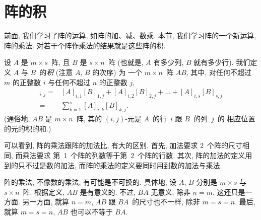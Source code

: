 \documentclass[../libro.tex]{subfiles}
\begin{document}

\section{阵的积}

前面, 我们学习了阵的运算, 如阵的加、减、数乘.
本节, 我们学习阵的一个新运算, 阵的乘法.
对若干个阵作乘法的结果就是这些阵的积.

\begin{definition}
    设 \(A\) 是 \(m \times s\)~阵,
    且 \(B\) 是 \(s \times n\)~阵
    (也就是, \(A\) 有多少列, \(B\) 就有多少行).
    我们定义 \(A\) 与 \(B\)~的\emph{积}
    (注意 \(A\), \(B\) 的次序) 为%
    一个 \(m \times n\)~阵 \(AB\),
    其中, 对任何不超过 \(m\) 的正整数 \(i\)
    与任何不超过 \(n\) 的正整数 \(j\),
    \begin{align*}
        [AB]_{i,j}
        = {} &
        [A]_{i,1} [B]_{1,j}
        + [A]_{i,2} [B]_{2,j}
        + \dots
        + [A]_{i,s} [B]_{s,j}
        \\
        = {} &
        \sum_{k = 1}^{s} {[A]_{i,k} [B]_{k,j}}.
    \end{align*}
    (通俗地, \(AB\) 是 \(m \times n\)~阵, %
    其的 \((i, j)\)-元是
    \(A\)~的行~\(i\) 跟 \(B\)~的列~\(j\)~的%
    相应位置的元的积的和.) %
\end{definition}

可以看到, 阵的乘法跟阵的加法比, 有大的区别.
首先, 加法要求 \(2\)~个阵的尺寸相同, 而乘法要求%
第~1~个阵的列数等于第~2~个阵的行数.
其次, 阵的加法的定义用到的只不过是数的加法,
而阵的乘法的定义要同时用到数的加法与乘法.

阵的乘法, 不像数的乘法, 有可能是不可换的.
具体地,
设 \(A\), \(B\) 分别是 \(m \times s\) 与 \(s \times n\)~阵.
根据定义, \(AB\) 是有意义的.
不过, \(BA\) 无意义, 除非 \(n = m\).
这还只是一方面.
另一方面, 就算 \(n = m\),
\(AB\) 跟 \(BA\)~的尺寸也不一样,
除非 \(m = s = n\).
最后, 就算 \(m = s = n\),
\(AB\) 也可以不等于 \(BA\).
\end{document}
